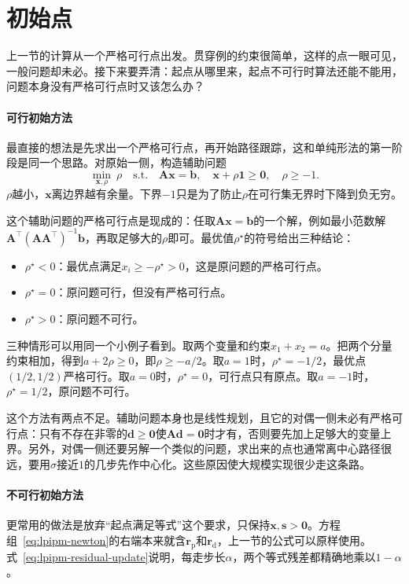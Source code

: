 \section{初始点}
\label{sec:lpipm-initial-point}

上一节的计算从一个严格可行点出发。贯穿例的约束很简单，这样的点一眼可见，一般问题却未必。接下来要弄清：起点从哪里来，起点不可行时算法还能不能用，问题本身没有严格可行点时又该怎么办？

\paragraph{可行初始方法}
最直接的想法是先求出一个严格可行点，再开始路径跟踪，这和单纯形法的第一阶段是同一个思路。对原始一侧，构造辅助问题
\begin{equation}
 \min_{\bm{x},\rho}\ \rho\quad\text{s.t.}\quad\bm{A}\bm{x}=\bm{b},\quad\bm{x}+\rho\bm{1}\geq\bm{0},\quad\rho\geq-1.
 \label{eq:lpipm-phase-one}
\end{equation}
$\rho$越小，$\bm{x}$离边界越有余量。下界$-1$只是为了防止$\rho$在可行集无界时下降到负无穷。

这个辅助问题的严格可行点是现成的：任取$\bm{A}\bm{x}=\bm{b}$的一个解，例如最小范数解$\bm{A}^\top(\bm{A}\bm{A}^\top)^{-1}\bm{b}$，再取足够大的$\rho$即可。最优值$\rho^\star$的符号给出三种结论：

\begin{itemize}
 \item $\rho^\star<0$：最优点满足$x_i\geq-\rho^\star>0$，这是原问题的严格可行点。
 \item $\rho^\star=0$：原问题可行，但没有严格可行点。
 \item $\rho^\star>0$：原问题不可行。
\end{itemize}

三种情形可以用同一个小例子看到。取两个变量和约束$x_1+x_2=a$。把两个分量约束相加，得到$a+2\rho\geq0$，即$\rho\geq-a/2$。取$a=1$时，$\rho^\star=-1/2$，最优点$(1/2,1/2)$严格可行。取$a=0$时，$\rho^\star=0$，可行点只有原点。取$a=-1$时，$\rho^\star=1/2$，原问题不可行。

这个方法有两点不足。辅助问题本身也是线性规划，且它的对偶一侧未必有严格可行点：只有不存在非零的$\bm{d}\geq\bm{0}$使$\bm{A}\bm{d}=\bm{0}$时才有，否则要先加上足够大的变量上界。另外，对偶一侧还要另解一个类似的问题，求出来的点也通常离中心路径很远，要用$\sigma$接近$1$的几步先作中心化。这些原因使大规模实现很少走这条路。

\paragraph{不可行初始方法}
更常用的做法是放弃“起点满足等式”这个要求，只保持$\bm{x},\bm{s}>\bm{0}$。方程组~\eqref{eq:lpipm-newton}的右端本来就含$\bm{r}_{\mathrm{p}}$和$\bm{r}_{\mathrm{d}}$，上一节的公式可以原样使用。式~\eqref{eq:lpipm-residual-update}说明，每走步长$\alpha$，两个等式残差都精确地乘以$1-\alpha$。

